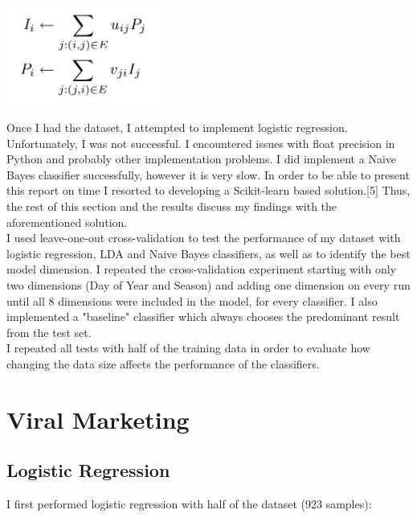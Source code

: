 \documentclass[conference,letterpaper]{IEEEtran}
\begin{document}
\centerline{
  \includegraphics[width=2.0in]{influence_passivity.png}
}

\indent Once I had the dataset, I attempted to implement logistic regression. Unfortunately, I was not successful. I encountered
issues with float precision in Python and probably other implementation problems. I did implement a Naive Bayes classifier
successfully, however it is very slow.  In order to be able to present this report on time I resorted to developing 
a Scikit-learn based solution.[5] Thus, the rest of this section and the results discuss my findings with the aforementioned solution. \\
\indent I used leave-one-out cross-validation to test the performance of my dataset with logistic regression, LDA and Naive Bayes
classifiers, as well as to identify the best model dimension. I repeated the cross-validation experiment starting with only two
dimensions (Day of Year and Season) and adding one dimension on every run until all 8 dimensions were included in the model, for
every classifier. I also implemented a "baseline" classifier which always chooses the predominant result from the test set. \\
\indent I repeated all tests with half of the training data in order to evaluate how changing the data size affects the
performance of the classifiers. \\

\section{Viral Marketing}


\subsection{Logistic Regression}
I first performed logistic regression with half of the dataset (923 samples):
\end{document}

